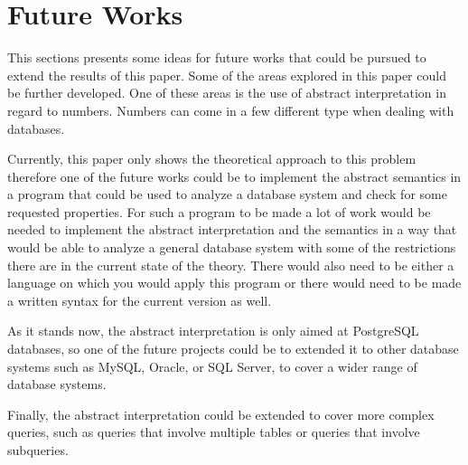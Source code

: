\section{Future Works}\label{sec:future-works}
This sections presents some ideas for future works that could be pursued to extend the results of this paper.
Some of the areas explored in this paper could be further developed.
One of these areas is the use of abstract interpretation in regard to numbers.
Numbers can come in a few different type when dealing with databases.

Currently, this paper only shows the theoretical approach to this problem therefore one of the future works could be to implement the abstract semantics in a program that could be used to analyze a database system and check for some requested properties.
For such a program to be made a lot of work would be needed to implement the abstract interpretation and the semantics in a way that would be able to analyze a general database system with some of the restrictions there are in the current state of the theory.
There would also need to be either a language on which you would apply this program or there would need to be made a written syntax for the current version as well.

As it stands now, the abstract interpretation is only aimed at PostgreSQL databases, so one of the future projects could be to extended it to other database systems such as MySQL, Oracle, or SQL Server, to cover a wider range of database systems.

Finally, the abstract interpretation could be extended to cover more complex queries, such as queries that involve multiple tables or queries that involve subqueries.
